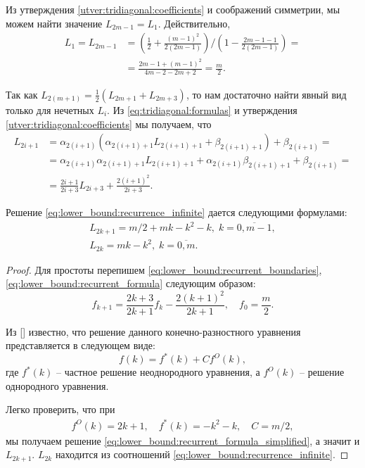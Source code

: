 Из утверждения \ref{utver:tridiagonal:coefficients} и соображений симметрии, мы можем найти значение $ L_{2m - 1} = L_1 $. Действительно,
\begin{align}
\label{eq:lower_bound:recurrent_boundaries}
L_1 = L_{2m-1} &= 
\left(
    \frac{1}{2} + \frac{(m-1)^2}{2(2m-1)}
\right)
/
\left(
    1 - \frac{2m-1-1}{2(2m-1)}
\right) = \nonumber \\
&= \frac{
    2m - 1 + (m-1)^2
}{
    4m - 2 - 2m + 2
} = \frac{m}{2}.
\end{align}

Так как 
$ L_{2(m + 1)} = \frac{1}{2} (L_{2m+1} + L_{2m+3}) $,
то нам достаточно найти явный вид только для нечетных $ L_i $. Из \eqref{eq:tridiagonal:formulas} и утверждения \ref{utver:tridiagonal:coefficients} мы получаем, что
\begin{align}
\label{eq:lower_bound:recurrent_formula}
L_{2i+1} &= \alpha_{2(i+1)}(
    \alpha_{2(i+1)+1} L_{2(i+1)+1} + \beta_{2(i+1)+1}
    ) + \beta_{2(i+1)} = \nonumber \\
&= \alpha_{2(i+1)}\alpha_{2(i+1)+1} L_{2(i+1)+1} +
    \alpha_{2(i+1)}\beta_{2(i+1)+1} + \beta_{2(i+1)} = \nonumber \\
&= \frac{2i+1}{2i+3} L_{2i+3} + \frac{2(i+1)^2}{2i+3}.
\end{align}

\begin{utver}
\label{utver:lower_bound:solution}
Решение \eqref{eq:lower_bound:recurrence_infinite} дается следующими формулами:
\begin{gather*}
\label{eq:lower_bound:recurrence_solution}
    L_{2k+1} = m/2 + mk - k^2 - k, \;
    k = \overline{0, m-1}, \\
    L_{2k} = mk - k^2, \;
    k = \overline{0, m}.
\end{gather*}
\end{utver}
\begin{proof}
Для простоты перепишем \eqref{eq:lower_bound:recurrent_boundaries}, \eqref{eq:lower_bound:recurrent_formula} следующим образом:
\begin{equation}
\label{eq:lower_bound:recurrent_formula_simplified}
f_{k+1} = \frac{2k+3}{2k+1} f_k - \frac{2(k+1)^2}{2k+1}, \quad f_0 = \frac{m}{2}.
\end{equation}

Из [\gelfond] известно, что решение данного конечно-разностного уравнения представляется в следующем виде:
\[
f(k) = f^*(k) + Cf^O(k),
\]
где $ f^*(k) $ -- частное решение неоднородного уравнения, а $ f^O(k) $ -- решение однородного уравнения.

Легко проверить, что при
\[
\begin{array}{rcl}
  f^O(k) = 2k + 1, \quad
  f^*(k) = -k^2 - k, \quad
  C = m/2,
\end{array}
\]
мы получаем решение \eqref{eq:lower_bound:recurrent_formula_simplified}, а значит и $ L_{2k+1} $. 
$ L_{2k} $ находится из соотношений \eqref{eq:lower_bound:recurrence_infinite}.
\end{proof}

